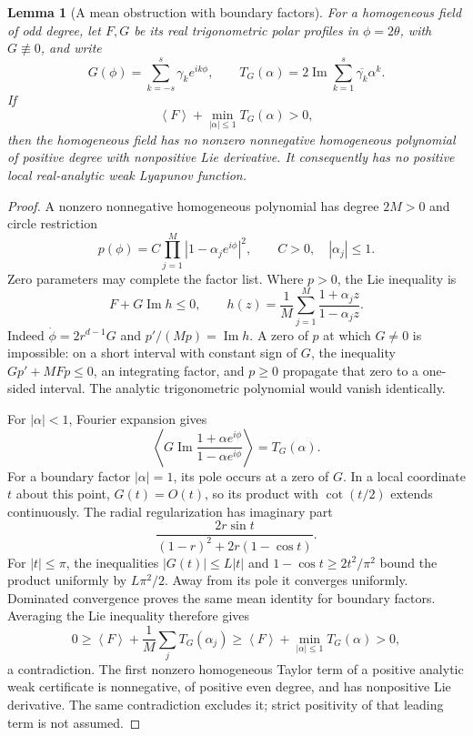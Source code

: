 \documentclass[11pt,a4paper]{article}
\newtheorem{lemma}[theorem]{Lemma}
\theoremstyle{remark}\newtheorem{remark}[theorem]{Remark}
\newcommand{\av}[1]{\left\langle #1\right\rangle}
\newcommand{\Ima}{\operatorname{Im}}
\begin{document}
\begin{lemma}[A mean obstruction with boundary factors]\label{lem:zeros}
For a homogeneous field of odd degree, let \(F,G\) be its real
trigonometric polar profiles in \(\phi=2\theta\),
with \(G\not\equiv0\), and write
\[
 G(\phi)=\sum_{k=-s}^s\gamma_k e^{ik\phi},\qquad
 T_G(\alpha)=2\Ima\sum_{k=1}^s\overline{\gamma_k}\alpha^k.
\]
If
\begin{equation}\label{eq:zeroobstruction}
 \av{F}+\min_{|\alpha|\leq1}T_G(\alpha)>0,
\end{equation}
then the homogeneous field has no nonzero nonnegative homogeneous
polynomial of positive degree with nonpositive Lie derivative.
It consequently has no positive local real-analytic weak Lyapunov function.
\end{lemma}
\begin{proof}
A nonzero nonnegative homogeneous polynomial has degree \(2M>0\)
and circle restriction
\[
 p(\phi)=C\prod_{j=1}^M|1-\alpha_j e^{i\phi}|^2,
 \qquad C>0,\quad |\alpha_j|\leq1.
\]
Zero parameters may complete the factor list. Where \(p>0\), the
Lie inequality is
\[
 F+G\Ima h\leq0,\qquad
 h(z)=\frac1M\sum_{j=1}^M\frac{1+\alpha_jz}{1-\alpha_jz}.
\]
Indeed \(\dot\phi=2r^{d-1}G\) and
\(p'/(Mp)=\Ima h\). A zero of \(p\) at which \(G\ne0\)
is impossible: on a short interval with constant sign of \(G\),
the inequality \(Gp'+MFp\leq0\), an integrating factor, and
\(p\geq0\) propagate that zero to a one-sided interval. The
analytic trigonometric polynomial would vanish identically.

For \(|\alpha|<1\), Fourier expansion gives
\[
 \av{G\Ima\frac{1+\alpha e^{i\phi}}{1-\alpha e^{i\phi}}}
 =T_G(\alpha).
\]
For a boundary factor \(|\alpha|=1\), its pole occurs at a zero
of \(G\). In a local coordinate \(t\) about this point,
\(G(t)=O(t)\), so its product with \(\cot(t/2)\) extends
continuously. The radial regularization has imaginary part
\[
 \frac{2r\sin t}{(1-r)^2+2r(1-\cos t)}.
\]
For \(|t|\leq\pi\), the inequalities
\(|G(t)|\leq L|t|\) and
\(1-\cos t\geq2t^2/\pi^2\) bound the product uniformly by
\(L\pi^2/2\). Away from its pole it converges uniformly.
Dominated convergence proves the same mean identity for boundary
factors. Averaging the Lie inequality therefore gives
\[
 0\geq\av{F}+\frac1M\sum_jT_G(\alpha_j)
 \geq\av{F}+\min_{|\alpha|\leq1}T_G(\alpha)>0,
\]
a contradiction. The first nonzero homogeneous Taylor term of a
positive analytic weak certificate is nonnegative, of positive even
degree, and has nonpositive Lie derivative. The same contradiction
excludes it; strict positivity of that leading term is not assumed.
\end{proof}
\end{document}
